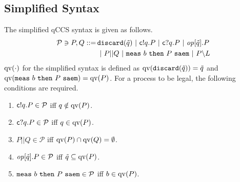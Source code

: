 \subsection{Simplified Syntax}
\label{symqccs:modifiedsyntax}
\begin{defi}
The simplified qCCS syntax is given as follows.
\begin{align*}
\mathcal{P} \ni P,Q ::=\, &\mathtt{discard(} \tilde q \mathtt{)} ~|~ \mathsf{c}! q.P ~|~
 \mathsf{c}? q.P
 ~|~\mathit{op}[\tilde q].P\\
&~|~ P||Q ~|~ {\tt meas}~b~{\tt then}~P~{\tt saem} ~|~ P
 \backslash L
\end{align*}
$\mathrm{qv}(\cdot)$ for the simplified syntax is defined as
$\mathrm{qv}(\mathtt{discard(} \tilde q \mathtt{)}) = \tilde q$ and \\
$\mathrm{qv}({\tt meas}~b~{\tt then}~P~{\tt saem}) = \mathrm{qv}(P)$.
For a process to be legal, the following conditions are required.
 \begin{enumerate}
 \item $\mathsf{c}! q.P \in \mathcal{P}$ iff $q \notin \mathrm{qv}(P)$.
 \item $\mathsf{c}? q.P \in \mathcal{P}$ iff $q \in \mathrm{qv}(P)$.
 \item $P||Q \in \mathcal{P}$ iff $\mathrm{qv}(P) \cap \mathrm{qv}(Q) = \emptyset$.
 \item $\mathit{op}[\tilde q].P \in \mathcal{P}$ iff $\tilde q \subseteq \mathrm{qv}(P)$.
 \item ${\tt meas}~b~{\tt then}~P~{\tt saem} \in \mathcal{P}$ iff $b \in \mathrm{qv}(P)$.%
 \end{enumerate}
\end{defi}

